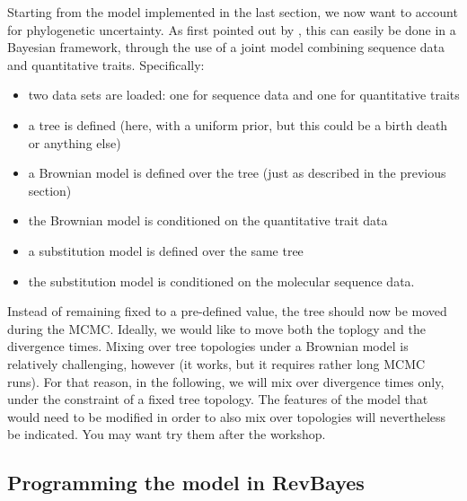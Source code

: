 Starting from the model implemented in the last section, we now want to account for phylogenetic uncertainty. As first pointed out by \cite{Huelsenbeck:2003p999}, this can easily be done in a Bayesian framework, through the use of a joint model combining sequence data and quantitative traits. Specifically:
\begin{itemize}
\item
two data sets are loaded: one for sequence data and one for quantitative traits
\item
a tree is defined (here, with a uniform prior, but this could be a birth death or anything else)
\item
a Brownian model is defined over the tree (just as described in the previous section)
\item
the Brownian model is conditioned on the quantitative trait data
\item
a substitution model is defined over the same tree
\item
the substitution model is conditioned on the molecular sequence data.
\end{itemize}
Instead of remaining fixed to a pre-defined value,
the tree should now be moved during the MCMC.
Ideally, we would like to move both the toplogy and the divergence times.
Mixing over tree topologies under a Brownian model is relatively challenging, however
(it works, but it requires rather long MCMC runs).
For that reason, in the following, we will mix over divergence times only,
under the constraint of a fixed tree topology.
The features of the model that would need to be modified in order to also mix over topologies
will nevertheless be indicated. You may want try them after the workshop.

\subsection{Programming the model in RevBayes}

